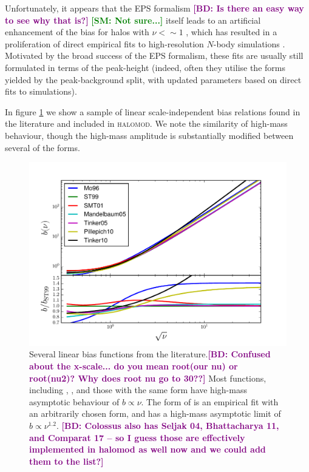 \documentclass[5p]{elsarticle}
\newcommand{\bd}[1]{\textcolor{purple}{\textbf{[BD: #1]}}}
\newcommand{\sgm}[1]{\textcolor{green}{\textbf{[SM: #1]}}}
\begin{document}
Unfortunately, it appears that the EPS formalism \bd{Is there an easy way to see why that is?} \sgm{Not sure...} itself leads to an artificial enhancement of the bias for halos with $\nu < \sim 1$ \citep{Manera2010,Tinker2010}, which has resulted in a proliferation of direct empirical fits to high-resolution $N$-body simulations \citep{Jing1998,Jing1999,Seljak2004,Tinker2005,Mandelbaum2005,Pillepich2010}.
Motivated by the broad success of the EPS formalism, these fits are usually \citep[but see][]{Jing1998,Seljak2004} still formulated in terms of the peak-height (indeed, often they utilise the forms yielded by the peak-background split, with updated parameters based on direct fits to simulations).

In figure \ref{fig:bias_functions} we show a sample of linear scale-independent bias relations found in the literature and included in \textsc{halomod}. We note the similarity of high-mass behaviour, though the high-mass amplitude is substantially modified between several of the forms. 

\begin{figure}
  \centering
  \includegraphics[width=\linewidth]{figures/bias.pdf}
  \caption[Several bias functions from the literature]{Several linear bias functions from the literature.\bd{Confused about the x-scale... do you mean root(our nu) or root(nu2)? Why does root nu go to 30??} Most functions, including \protect\citet{Mo1996}, \protect\citet{Sheth1999}, \protect\citet{Sheth2001} and those with the same form \protect\citep{Mandelbaum2005,Tinker2005} have high-mass asymptotic behaviour of $b \propto \nu$. The form of \protect\citet{Tinker2010} is an empirical fit with an arbitrarily chosen form, and has a high-mass asymptotic limit of $b \propto  \nu^{1.2}$. \bd{Colossus also has Seljak 04, Bhattacharya 11, and Comparat 17 -- so I guess those are effectively implemented in halomod as well now and we could add them to the list?}}
  \label{fig:bias_functions}
\end{figure}
\end{document}
